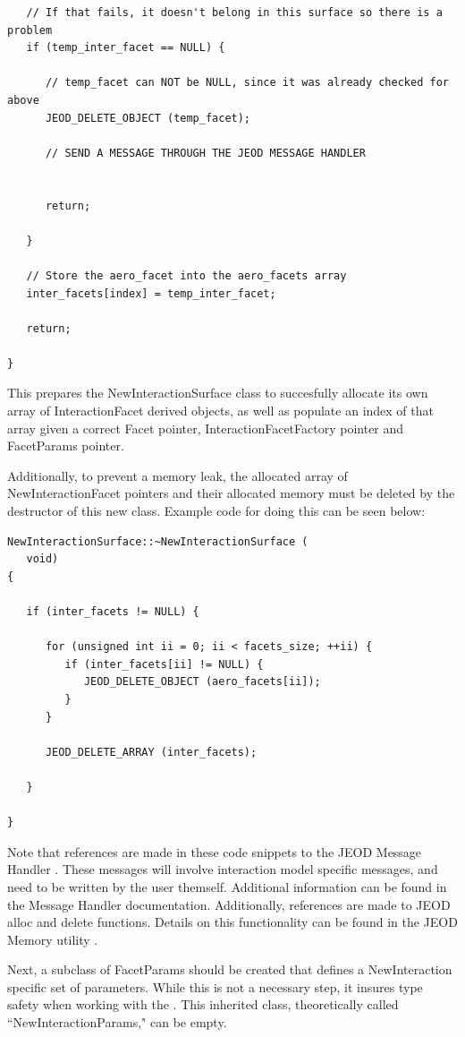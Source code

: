 \begin{verbatim}
   // If that fails, it doesn't belong in this surface so there is a problem
   if (temp_inter_facet == NULL) {

      // temp_facet can NOT be NULL, since it was already checked for above
      JEOD_DELETE_OBJECT (temp_facet);

      // SEND A MESSAGE THROUGH THE JEOD MESSAGE HANDLER


      return;

   }

   // Store the aero_facet into the aero_facets array
   inter_facets[index] = temp_inter_facet;

   return;

}
\end{verbatim}

This prepares the NewInteractionSurface class to succesfully allocate its
own array of InteractionFacet derived objects, as well as populate an
index of that array given a correct Facet pointer, InteractionFacetFactory
pointer and FacetParams pointer.

Additionally, to prevent a memory leak, the allocated array of
NewInteractionFacet pointers and their allocated memory must be
deleted by the destructor of this new class. Example code for doing this
can be seen below:

\begin{verbatim}
NewInteractionSurface::~NewInteractionSurface (
   void)
{

   if (inter_facets != NULL) {

      for (unsigned int ii = 0; ii < facets_size; ++ii) {
         if (inter_facets[ii] != NULL) {
            JEOD_DELETE_OBJECT (aero_facets[ii]);
         }
      }

      JEOD_DELETE_ARRAY (inter_facets);

   }

}
\end{verbatim}

Note that references are made in these code snippets 
to the JEOD Message Handler
\cite{dynenv:MESSAGE}. These messages will involve interaction model
specific messages, and need to be written by the user themself. Additional
information can be found in the Message Handler documentation. Additionally,
references are made to JEOD alloc and delete functions. Details on this
functionality can be found in the JEOD Memory utility
\cite{dynenv:MEMORY}.

Next, a subclass of FacetParams should be created that defines a
NewInteraction specific set of parameters. While this is not a necessary
step, it insures type safety when working with the \ModelDesc.
This inherited class, theoretically called ``NewInteractionParams," can be
empty.

